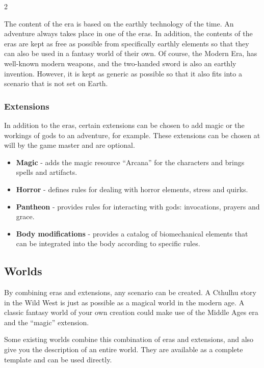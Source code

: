 \begin{multicols}{2}
{The content of the era is based on the earthly technology of the time. An adventure always takes place in one of the eras. In addition, the contents of the eras are kept as free as possible from specifically earthly elements so that they can also be used in a fantasy world of their own. Of course, the Modern Era, has well-known modern weapons, and the two-handed sword is also an earthly invention. However, it is kept as generic as possible so that it also fits into a scenario that is not set on Earth.

\subsubsection{Extensions} 

In addition to the eras, certain extensions can be chosen to add magic or the workings of gods to an adventure, for example. These extensions can be chosen at will by the game master and are optional.
\begin{itemize}
    \item \textbf{Magic} - adds the magic resource ``Arcana'' for the characters and brings spells and artifacts.
    \item \textbf{Horror} - defines rules for dealing with horror elements, stress and quirks.
    \item \textbf{Pantheon} - provides rules for interacting with gods: invocations, prayers and grace.
    \item \textbf{Body modifications} - provides a catalog of biomechanical elements that can be integrated into the body according to specific rules.
\end{itemize}

\subsection{Worlds} 

By combining eras and extensions, any scenario can be created. A Cthulhu story in the Wild West is just as possible as a magical world in the modern age. A classic fantasy world of your own creation could make use of the Middle Ages era and the ``magic'' extension.

Some existing worlds combine this combination of eras and extensions, and also give you the description of an entire world. They are available as a complete template and can be used directly.

}
\end{multicols}
